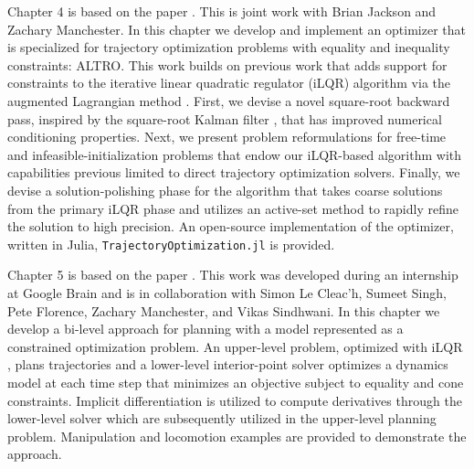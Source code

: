 Chapter 4 is based on the paper \cite{howell2019altro}. This is joint work with Brian Jackson and Zachary Manchester. In this chapter we develop and implement an optimizer that is specialized for trajectory optimization problems with equality and inequality constraints: ALTRO. This work builds on previous work that adds support for constraints to the iterative linear quadratic regulator (iLQR) algorithm via the augmented Lagrangian method \cite{lantoine2012hybrid, plancher2017constrained}. First, we devise a novel square-root backward pass, inspired by the square-root Kalman filter \cite{kaminski1971discrete}, that has improved numerical conditioning properties. Next, we present problem reformulations for free-time and infeasible-initialization problems that endow our iLQR-based algorithm with capabilities previous limited to direct trajectory optimization solvers. Finally, we devise a solution-polishing phase for the algorithm that takes coarse solutions from the primary iLQR phase and utilizes an active-set method \cite{nocedal2006numerical} to rapidly refine the solution to high precision. An open-source implementation of the optimizer, written in Julia, \texttt{TrajectoryOptimization.jl} is provided. 

Chapter 5 is based on the paper \cite{howell2022trajectory}. This work was developed during an internship at Google Brain and is in collaboration with Simon Le Cleac'h, Sumeet Singh, Pete Florence, Zachary Manchester, and Vikas Sindhwani. In this chapter we develop a bi-level approach for planning with a model represented as a constrained optimization problem. An upper-level problem, optimized with iLQR \cite{jacobson1970differential}, plans trajectories and a lower-level interior-point solver \cite{mehrotra1992implementation} optimizes a dynamics model at each time step that minimizes an objective subject to equality and cone constraints. Implicit differentiation \cite{dini1907lezioni} is utilized to compute derivatives through the lower-level solver which are subsequently utilized in the upper-level planning problem. Manipulation and locomotion examples are provided to demonstrate the approach.


